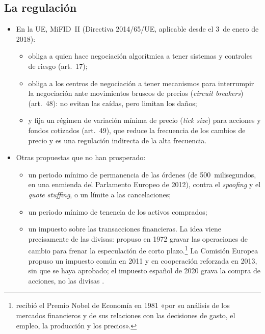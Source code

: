 \documentclass[11pt]{article}
\begin{document}
\subsection{La regulación}

\begin{itemize}
\item En la UE, MiFID~II (Directiva 2014/65/UE, aplicable desde el 3~de enero de 2018)\nocite{UE2014MiFID2}:
  \begin{itemize}
  \item obliga a quien hace negociación algorítmica a tener sistemas y controles de riesgo (art.~17);
  \item obliga a los centros de negociación a tener mecanismos para interrumpir la negociación ante movimientos bruscos de precios (\emph{circuit breakers}) (art.~48): no evitan las caídas, pero limitan los daños;
  \item y fija un régimen de variación mínima de precio (\emph{tick size}) para acciones y fondos cotizados (art.~49)\nocite{UE2017TickSize}, que reduce la frecuencia de los cambios de precio y es una regulación indirecta de la alta frecuencia.
  \end{itemize}
\item Otras propuestas que no han prosperado:
  \begin{itemize}
  \item un periodo mínimo de permanencia de las órdenes (de 500~milisegundos, en una enmienda del Parlamento Europeo de 2012), contra el \emph{spoofing} y el \emph{quote stuffing}, o un límite a las cancelaciones;
  \item un periodo mínimo de tenencia de los activos comprados;
  \item un impuesto sobre las transacciones financieras. La idea viene precisamente de las divisas:  propuso en 1972 gravar las operaciones de cambio para frenar la especulación de corto plazo\nocite{Tobin1978Proposal}.\footnote{ recibió el Premio Nobel de Economía en 1981 «por su análisis de los mercados financieros y de sus relaciones con las decisiones de gasto, el empleo, la producción y los precios»\nocite{Nobel1981Tobin}.} La Comisión Europea propuso un impuesto común en 2011 y en cooperación reforzada en 2013, sin que se haya aprobado\nocite{CE2011ITF,CE2013ITF}; el impuesto español de 2020 grava la compra de acciones, no las divisas\nocite{BOE2020ITF} .
  \end{itemize}
\end{itemize}
\end{document}

